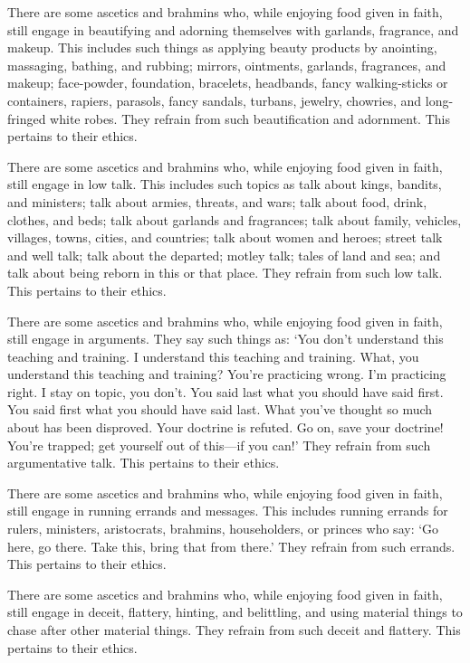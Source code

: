 \documentclass[12pt,openany]{book}%
\begin{document}
There are some ascetics and brahmins who, while enjoying food given in faith, still engage in beautifying and adorning themselves with garlands, fragrance, and makeup. This includes such things as applying beauty products by anointing, massaging, bathing, and rubbing; mirrors, ointments, garlands, fragrances, and makeup; face-powder, foundation, bracelets, headbands, fancy walking-sticks or containers, rapiers, parasols, fancy sandals, turbans, jewelry, chowries, and long-fringed white robes. They refrain from such beautification and adornment. This pertains to their ethics. 

There are some ascetics and brahmins who, while enjoying food given in faith, still engage in low talk. This includes such topics as talk about kings, bandits, and ministers; talk about armies, threats, and wars; talk about food, drink, clothes, and beds; talk about garlands and fragrances; talk about family, vehicles, villages, towns, cities, and countries; talk about women and heroes; street talk and well talk; talk about the departed; motley talk; tales of land and sea; and talk about being reborn in this or that place. They refrain from such low talk. This pertains to their ethics. 

There are some ascetics and brahmins who, while enjoying food given in faith, still engage in arguments. They say such things as: ‘You don’t understand this teaching and training. I understand this teaching and training. What, you understand this teaching and training? You’re practicing wrong. I’m practicing right. I stay on topic, you don’t. You said last what you should have said first. You said first what you should have said last. What you’ve thought so much about has been disproved. Your doctrine is refuted. Go on, save your doctrine! You’re trapped; get yourself out of this—if you can!’ They refrain from such argumentative talk. This pertains to their ethics. 

There are some ascetics and brahmins who, while enjoying food given in faith, still engage in running errands and messages. This includes running errands for rulers, ministers, aristocrats, brahmins, householders, or princes who say: ‘Go here, go there. Take this, bring that from there.’ They refrain from such errands. This pertains to their ethics. 

There are some ascetics and brahmins who, while enjoying food given in faith, still engage in deceit, flattery, hinting, and belittling, and using material things to chase after other material things. They refrain from such deceit and flattery. This pertains to their ethics. 
\end{document}

